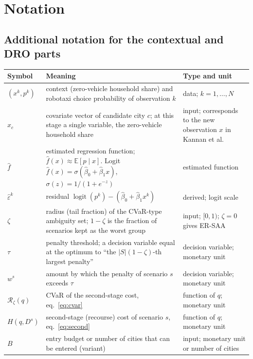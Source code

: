 \documentclass[10pt,a4paper]{article}
\DeclareMathOperator{\logit}{logit}
\begin{document}
\section{Notation}
\subsection{Additional notation for the contextual and DRO parts}
{\footnotesize
\begin{longtable}{@{}L{0.14\textwidth}L{0.45\textwidth}L{0.35\textwidth}@{}}
\toprule Symbol & Meaning & Type and unit\\\midrule\endhead\bottomrule\endlastfoot
$(x^k,p^k)$ & context (zero-vehicle household share) and robotaxi choice probability of observation $k$ & data; $k=1,\dots,N$\\
$x_c$ & covariate vector of candidate city $c$; at this stage a single variable, the zero-vehicle household share & input; corresponds to the new observation $x$ in Kannan et al.\\
$\hat f$ & estimated regression function; $\hat f(x)\approx\mathbb E[p\mid x]$. Logit $\hat f(x)=\sigma(\hat\beta_0+\hat\beta_1x)$, $\sigma(z)=1/(1+e^{-z})$ & estimated function\\
$\hat\varepsilon^k$ & residual $\logit(p^k)-(\hat\beta_0+\hat\beta_1x^k)$ & derived; logit scale\\
$\zeta$ & radius (tail fraction) of the CVaR-type ambiguity set; $1-\zeta$ is the fraction of scenarios kept as the worst group & input; $[0,1)$; $\zeta=0$ gives ER-SAA\\
$\tau$ & penalty threshold; a decision variable equal at the optimum to ``the $|S|(1-\zeta)$-th largest penalty'' & decision variable; monetary unit\\
$w^s$ & amount by which the penalty of scenario $s$ exceeds $\tau$ & decision variable; monetary unit\\
$\mathcal R_\zeta(q)$ & CVaR of the second-stage cost, eq.\ \eqref{eq:cvar} & function of $q$; monetary unit\\
$H(q,D^s)$ & second-stage (recourse) cost of scenario $s$, eq.\ \eqref{eq:second} & function of $q$; monetary unit\\
$B$ & entry budget or number of cities that can be entered (variant) & input; monetary unit or number of cities\\
\end{longtable}}
\end{document}
